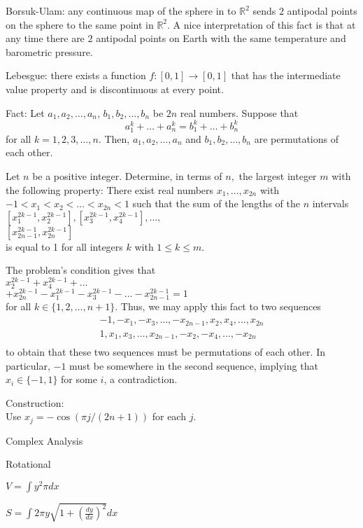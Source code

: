 Borsuk-Ulam: any continuous map of the sphere in to $\mathbb{R}^2$ sends $2$ antipodal points on the sphere to the same point in $\mathbb{R}^2$. A nice interpretation of this fact is that at any time there are $2$ antipodal points on Earth with the same temperature and barometric pressure.

Lebesgue: there exists a function $f: [0,1] \to [0,1]$ that has the intermediate value property and is discontinuous at every point.

Fact: Let $a_1,a_2,\dots,a_n$, $b_1,b_2,\dots,b_n$ be $2n$ real numbers. Suppose that
$$a_1^k + \dots + a_n^k = b_1^k + \dots + b_n^k$$for all $k=1,2,3,\dots,n$. Then, $a_1,a_2,\dots,a_n$ and $b_1,b_2,\dots,b_n$ are permutations of each other.

Let $n$ be a positive integer. Determine, in terms of $n,$ the largest integer $m$ with the following property: There exist real numbers $x_1,\ldots, x_{2n}$ with $-1<x_1<x_2<\ldots<x_{2n}<1$ such that the sum of the lengths of the $n$ intervals \\
$[x_1^{2k-1},x_2^{2k-1}], [x_3^{2k-1},x_4^{2k-1}], \ldots,$ \\
$[x_{2n-1}^{2k-1},x_{2n}^{2k-1}]$ \\
is equal to 1 for all integers $k$ with $1\leq k \leq m.$

The problem's condition gives that \\
$x_2^{2k-1} + x_4^{2k-1} + \dots$ \\
$+ x_{2n}^{2k-1} - x_1^{2k-1} - x_3^{2k-1} - \dots - x_{2n-1}^{2k-1} = 1$\\
for all $k\in\{1,2,\dots,n+1\}$. Thus, we may apply this fact to two sequences
\begin{align*}
-1, -x_1, -x_3, \dots, -x_{2n-1}, x_2,x_4,\dots,x_{2n} \\
1, x_1, x_3, \dots, x_{2n-1}, -x_2,-x_4,\dots,-x_{2n} \\
\end{align*}to obtain that these two sequences must be permutations of each other. In particular, $-1$ must be somewhere in the second sequence, implying that $x_i\in\{-1,1\}$ for some $i$, a contradiction.

Construction: \\
Use $x_j = -\cos(\pi j/(2n+1))$ for each $j$.

Complex Analysis

Rotational

$V = \int y^2 \pi dx$

$S = \int 2\pi y \sqrt{1+\left(\frac{dy}{dx} \right)^2} dx$

